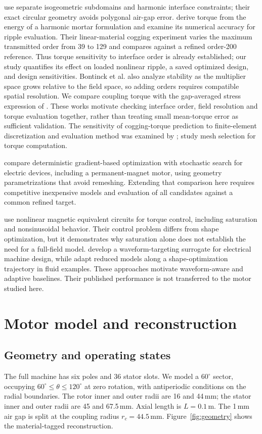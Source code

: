 \documentclass{anvil-paper}
\begin{document}
\citet{bontinck2018isogeometric} use separate isogeometric subdomains and
harmonic interface constraints; their exact circular geometry avoids
polygonal air-gap error. \citet{egger2022torque} derive torque from the
energy of a harmonic mortar formulation and examine its numerical
accuracy for ripple evaluation. Their linear-material cogging experiment
varies the maximum transmitted order from 39 to 129 and compares against
a refined order-200 reference. Thus torque sensitivity to interface order
is already established; our study quantifies its effect on loaded nonlinear
ripple, a saved optimized design, and design sensitivities.
Bontinck et al. also analyze stability as the multiplier space grows
relative to the field space, so adding orders requires compatible spatial
resolution. We compare coupling torque with the
gap-averaged stress expression of \citet{arkkio1987}. These works motivate
checking interface order, field resolution and torque evaluation together,
rather than treating small mean-torque error as sufficient validation.
The sensitivity of cogging-torque prediction to finite-element
discretization and evaluation method was examined by \citet{howe1992cogging};
\citet{arkkio2012proper} study mesh selection for torque computation.

\citet{ion2018robust} compare deterministic gradient-based optimization
with stochastic search for electric devices, including a permanent-magnet
motor, using geometry parametrizations that avoid remeshing. Extending
that comparison here requires competitive inexpensive models and evaluation
of all candidates against a common refined target.

\citet{kemmetmueller2015} use nonlinear magnetic equivalent circuits for
torque control, including saturation and nonsinusoidal behavior. Their
control problem differs from shape optimization, but it demonstrates why
saturation alone does not establish the need for a full-field model.
\citet{roomi2022} develop a waveform-targeting surrogate for electrical
machine design, while \citet{wen2023} adapt reduced models along a
shape-optimization trajectory in fluid examples. These approaches motivate
waveform-aware and adaptive baselines. Their published performance is not
transferred to the motor studied here.

\section{Motor model and reconstruction}
\subsection{Geometry and operating states}
The full machine has six poles and 36 stator slots. We model a
$60^\circ$ sector, occupying $60^\circ\leq\theta\leq120^\circ$ at zero
rotation, with antiperiodic conditions on the radial boundaries. The rotor
inner and outer radii are 16 and 44\,mm; the stator inner and outer radii
are 45 and 67.5\,mm. Axial length is $L=0.1$\,m. The 1\,mm air gap is
split at the coupling radius $r_c=44.5$\,mm. Figure~\ref{fig:geometry}
shows the material-tagged reconstruction.
\end{document}
